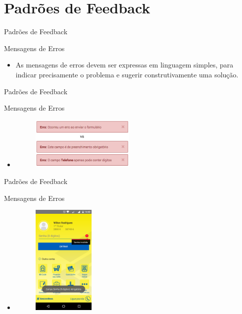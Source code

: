 \section{Padrões de Feedback}

\begin{frame}{Padrões de Feedback}
\begin{block}{Mensagens de Erros}
  \begin{itemize}
    \item<1-> As mensagens de erros devem ser expressas em linguagem simples, para indicar precisamente o problema e sugerir construtivamente uma solução. 
  \end{itemize}
\end{block}
\end{frame}

\begin{frame}{Padrões de Feedback}
\begin{block}{Mensagens de Erros}
  \begin{itemize}
    \item<1-> \begin{figure}[\center]
    \includegraphics[width=5cm]{figuras/error/msg_error}
    \end{figure}
  \end{itemize}
\end{block}
\end{frame}

\begin{frame}{Padrões de Feedback}
\begin{block}{Mensagens de Erros}
  \begin{itemize}
    \item<1-> \begin{figure}
    \includegraphics[width=3cm]{figuras/error/error2}
    \end{figure}
  \end{itemize}
\end{block}
\end{frame}

